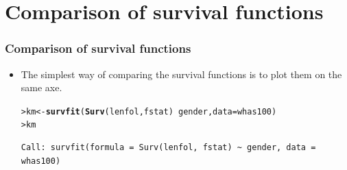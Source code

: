 \documentclass[10pt]{beamer}\usepackage[]{graphicx}\usepackage[]{color}
\makeatletter
\newcommand{\hlopt}[1]{\textcolor[rgb]{0,0,0}{#1}}%
\newcommand{\hlstd}[1]{\textcolor[rgb]{0.345,0.345,0.345}{#1}}%
\newcommand{\hlkwb}[1]{\textcolor[rgb]{0.69,0.353,0.396}{#1}}%
\newcommand{\hlkwc}[1]{\textcolor[rgb]{0.333,0.667,0.333}{#1}}%
\newcommand{\hlkwd}[1]{\textcolor[rgb]{0.737,0.353,0.396}{\textbf{#1}}}%
\newenvironment{kframe}{%
 \def\at@end@of@kframe{}%
 \ifinner\ifhmode%
  \def\at@end@of@kframe{\end{minipage}}%
  \begin{minipage}{\columnwidth}%
 \fi\fi%
 \def\FrameCommand##1{\hskip\@totalleftmargin \hskip-\fboxsep
 \colorbox{shadecolor}{##1}\hskip-\fboxsep
     \hskip-\linewidth \hskip-\@totalleftmargin \hskip\columnwidth}%
 \MakeFramed {\advance\hsize-\width
   \@totalleftmargin\z@ \linewidth\hsize
   \@setminipage}}%
 {\par\unskip\endMakeFramed%
 \at@end@of@kframe}
\newenvironment{knitrout}{}{} %
\renewenvironment{knitrout}{\setlength{\topsep}{-.2mm}}{}
\makeatother
\begin{document}
\section{Comparison of survival functions}
\begin{frame}[fragile]
  \frametitle{Comparison of survival functions}
  \begin{itemize}
  \item The simplest way of comparing the survival functions is to plot them on the same axe.
\begin{knitrout}\scriptsize
{}\color{fgcolor}\begin{kframe}
\begin{alltt}
\hlstd{> }\hlstd{km} \hlkwb{<-} \hlkwd{survfit}\hlstd{(}\hlkwd{Surv}\hlstd{(lenfol, fstat)} \hlopt{~} \hlstd{gender,} \hlkwc{data} \hlstd{= whas100)}
\hlstd{> }\hlstd{km}
\end{alltt}
\begin{verbatim}
Call: survfit(formula = Surv(lenfol, fstat) ~ gender, data = whas100)


\end{verbatim}
\end{kframe}
\end{knitrout}
\end{itemize}
\end{frame}
\end{document}
